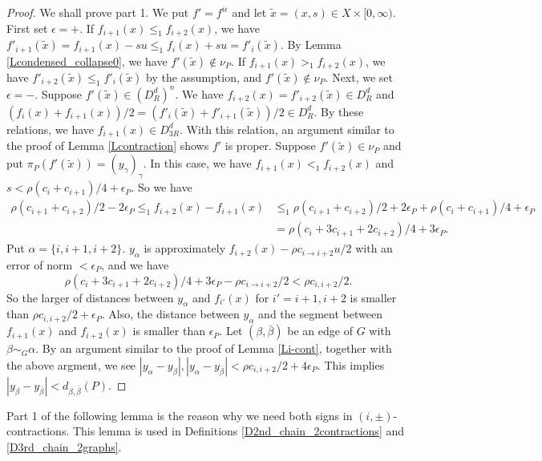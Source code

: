 \documentclass[reqno]{amsart}
\theoremstyle{definition}
\theoremstyle{plain}
\newcommand{\eps}{\epsilon}
\begin{document}
\begin{proof} We shall prove part 1. We put $f'=f^{i\eps}$ and let $\tilde x=(x,s)\in X\times [0,\infty)$. First set $\eps=+$. If $f_{i+1}(x)\leq_1f_{i+2}(x)$, we have $f'_{i+1}(\tilde x)=f_{i+1}(x)-su\leq _1f_i(x)+su=f'_i(\tilde x)$. By Lemma \ref{Lcondensed_collapse0}, we have $f'(\tilde x)\not\in \nu_P$. If $f_{i+1}(x)>_1f_{i+2}(x)$,  we have $f'_{i+2}(\tilde x)\leq _1f'_i(\tilde x)$ by the assumption, and $f'(\tilde x)\not\in \nu_P$. Next, we set $\eps=-$.
Suppose $f'(\tilde x)\in (D^d_R)^n$. We have $f_{i+2}(x)=f'_{i+2}(\tilde x)\in D^d_R$ and $(f_{i}(x)+f_{i+1}(x))/2=(f'_i(\tilde x)+f'_{i+1}(\tilde x))/2\in D^d_R$. By these relations, we have $f_{i+1}(x)\in D^d_{3R}$. With this relation, an argument similar to the proof of Lemma \ref{Lcontraction} shows $f'$ is proper. Suppose $f'(\tilde x)\in \nu_{P}$ and put $\pi_P(f'(\tilde x))=(y_\gamma)_\gamma$. %
In this case, we have $f_{i+1}(x)<_1f_{i+2}(x)$ and $s<\rho(c_i+c_{i+1})/4+\eps_{P}$. So we have
\[
\begin{split}
\rho(c_{i+1}+c_{i+2})/2-2\eps_{P}\leq_1 f_{i+2}(x)-f_{i+1}(x)&\leq_1\rho(c_{i+1}+c_{i+2})/2+2\eps_{P}+\rho (c_i+c_{i+1})/4+\eps_{P}\\
&=\rho(c_i+3c_{i+1}+2c_{i+2})/4+3\eps_{P}.
\end{split}
\]
Put $\alpha=\{i,i+1,i+2\}$. $y_\alpha$ is approximately $f_{i+2}(x)-\rho c_{i \to i+2} u/2$ with an error of norm $<\eps_{P}$, and we have 
\[
\rho(c_i+3c_{i+1}+2c_{i+2})/4+3\eps_{P}-\rho c_{i\to i+2}/2<\rho c_{i,i+2}/2.
\]
So the larger of distances between $y_\alpha$ and $f_{i'}(x)$ for $i'=i+1,i+2$ is smaller than $\rho c_{i,i+2}/2+\eps_P$. Also, the distance between $y_\alpha$ and the segment between $f_{i+1}(x)$ and $f_{i+2}(x)$ is smaller than $\eps_P$.
Let $(\beta, \bar \beta)$ be an edge of $G$ with  $\beta\sim_{G}\alpha$. By an argument similar to the proof of Lemma \ref{Li-cont}, together with the above argment, we see  
 $|y_\alpha-y_\beta|, |y_\alpha-y_{\bar \beta}|<\rho c_{i,i+2}/2+4\eps_P$. This implies $|y_\beta-y_{\bar\beta}|<d_{\beta,\bar\beta}(P)$.
\end{proof}
Part 1 of the following lemma is the reason why we need both signs in $(i,\pm)$-contractions. This lemma is used in Definitions \ref{D2nd_chain_2contractions} and \ref{D3rd_chain_2graphs}.
\end{document}
